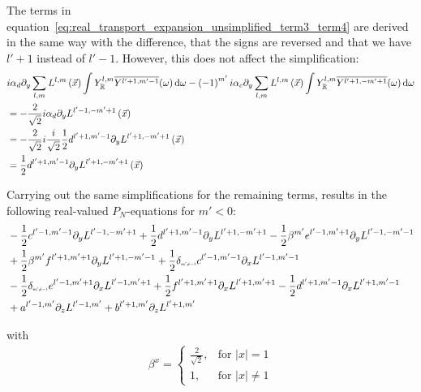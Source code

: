 \documentclass[10pt]{scrartcl}
\begin{document}
The terms in equation~\ref{eq:real_transport_expansion_unsimplified_term3_term4} are derived in the same way with the difference, that the signs are reversed and that we have $l'+1$ instead of $l'-1$. However, this does not affect the simplification:
\begin{align*}
&i\alpha_d\partial_y\sum_{l,m}L^{l,m}\left (\vec{x}\right)\int{Y_{\mathbb{R}}^{l,m}\overline{Y^{l'+1, m'-1}}(\omega )\,\mathrm{d}\omega}
-\left({-1}\right)^{m'}i\alpha_c\partial_y\sum_{l,m}L^{l,m}\left (\vec{x}\right)\int{Y_{\mathbb{R}}^{l,m}\overline{Y^{l'+1, -m'+1}}(\omega )\,\mathrm{d}\omega}
\\
&=-\frac{2}{\sqrt{2}}i
\alpha_d\partial_y
L^{l'-1,-m'+1}\left (\vec{x}\right)
\\
&=-\frac{2}{\sqrt{2}}i
\frac{i}{\sqrt{2}}\frac{1}{2}d^{{l'+1,m'-1}}
\partial_y
L^{l'+1,-m'+1}\left (\vec{x}\right)
\\
&=
\frac{1}{2}d^{{l'+1,m'-1}}
\partial_y
L^{l'+1,-m'+1}\left (\vec{x}\right)
\end{align*}

Carrying out the same simplifications for the remaining terms, results in the following real-valued $P_N$-equations for $m'<0$:
\begin{align*}
&-\frac{1}{2}c^{{l'-1,m'-1}}
\partial_y
L^{l'-1,-m'+1}
+\frac{1}{2}d^{{l'+1,m'-1}}
\partial_y
L^{l'+1,-m'+1}
-\frac{1}{2}\beta^{m'}e^{{l'-1,m'+1}}
\partial_y
L^{l'-1,-m'-1}
\\&
+\frac{1}{2}\beta^{m'}f^{{l'+1,m'+1}}
\partial_y
L^{l'+1,-m'-1}
+\frac{1}{2}\delta_{\scaleto{m'\neq -1}{4pt}}c^{{l'-1,m'-1}}
\partial_x
L^{l'-1,m'-1}
\\&
-\frac{1}{2}\delta_{\scaleto{m'\neq -1}{4pt}}e^{{l'-1,m'+1}}
\partial_x
L^{l'-1,m'+1}
+\frac{1}{2}f^{{l'+1,m'+1}}
\partial_x
L^{l'+1,m'+1}
-\frac{1}{2}d^{{l'+1,m'-1}}
\partial_x
L^{l'+1,m'-1}
\\&
+a^{{l'-1,m'}}
\partial_z
L^{l'-1,m'}
+b^{{l'+1,m'}}
\partial_z
L^{l'+1,m'}
\end{align*}

with
\begin{align}
\label{eq:real_sh_basis}
\beta^{x}=
\left\{
\begin{array}{lr}
\frac{2}{\sqrt{2}}, & \text{for } \vert x\vert = 1\\
1, & \text{for } \vert x\vert \neq 1
\end{array}
\right.
\end{align}
\end{document}
